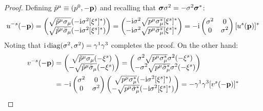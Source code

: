 \begin{proofbox}
  \begin{proof}
    Defining $ \tilde{p}^\mu \equiv (p^0, -\mathbf{p}) $ and recalling that $ \boldsymbol{\sigma} \sigma^2 = - \sigma^2 \boldsymbol{\sigma}^* $:
    \begin{equation*}
      u^{-s}(-\mathbf{p}) =
      \begin{pmatrix}
        \sqrt{\tilde{p}^\mu \sigma_\mu} (-\mathrm{i} \sigma^2 [\xi^s]^*) \\
        \sqrt{\tilde{p}^\mu \bar{\sigma}_\mu} (-\mathrm{i} \sigma^2 [\xi^s]^*)
      \end{pmatrix}
      =
      \begin{pmatrix}
        -\mathrm{i} \sigma^2 \sqrt{p^\mu \sigma_\mu^*} [\xi^s]^* \\
        -\mathrm{i} \sigma^2 \sqrt{p^\mu \bar{\sigma}_\mu^*} [\xi^s]^*
      \end{pmatrix}
      = -\mathrm{i} \begin{pmatrix} \sigma^2 & 0 \\ 0 & \sigma^2 \end{pmatrix} [u^s(\mathbf{p})]^*
    \end{equation*}
    Noting that $ \mathrm{i} \operatorname{diag}(\sigma^2,\sigma^2) = \gamma^1 \gamma^3 $ completes the proof. On the other hand:
    \begin{equation*}
      \begin{split}
        v^{-s}(-\mathbf{p})
        &=
        \begin{pmatrix}
          \sqrt{\tilde{p}^\mu \sigma_\mu} (-\xi^s) \\
          - \sqrt{\tilde{p}^\mu \bar{\sigma}_\mu} (-\xi^s)
        \end{pmatrix}
        = 
        \begin{pmatrix}
          \sigma^2 \sqrt{p^\mu \sigma_\mu^*} \sigma^2 (-\xi^s) \\
          - \sigma^2 \sqrt{p^\mu \bar{\sigma}_\mu^*} \sigma^2 (-\xi^s)
        \end{pmatrix}\\
        &= -\mathrm{i} \begin{pmatrix} \sigma^2 & 0 \\ 0 & \sigma^2 \end{pmatrix}
        \begin{pmatrix}
          \sqrt{p^\mu \sigma_\mu^*} (-\mathrm{i} \sigma^2 [\xi^s]^*) \\
          - \sqrt{p^\mu \bar{\sigma}_\mu^*} (-\mathrm{i} \sigma^2 [\xi^s]^*)
        \end{pmatrix}
        = - \gamma^1 \gamma^3 [v^s(-\mathbf{p})]^*
      \end{split}
    \end{equation*}
  \end{proof}
\end{proofbox}

